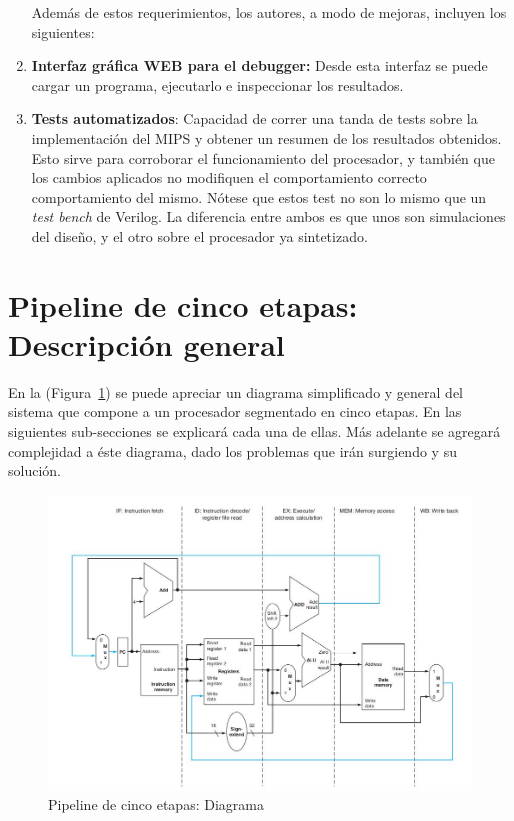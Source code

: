 \documentclass[12pt]{article}
\begin{document}
\begin{enumerate}
      Además de estos requerimientos, los autores, a modo de mejoras, incluyen los siguientes: \\

      \item \textbf{Interfaz gráfica WEB para el debugger:} Desde esta interfaz se puede cargar un programa, ejecutarlo e inspeccionar los resultados.
      \item \textbf{Tests automatizados}: Capacidad de correr una tanda de tests sobre la implementación del MIPS y obtener un resumen de los resultados obtenidos. Esto sirve para corroborar el funcionamiento del procesador, y también que los cambios aplicados no modifiquen el comportamiento correcto comportamiento del mismo. Nótese que estos test no son lo mismo que un \textit{test bench} de Verilog. La diferencia entre ambos es que unos son simulaciones del diseño, y el otro sobre el procesador ya sintetizado. 
\end{enumerate}

\section{Pipeline de cinco etapas: Descripción general}

En la (Figura~\ref{fig:pipeline}) se puede apreciar un diagrama simplificado y general del sistema que compone a un procesador segmentado en cinco etapas. En las siguientes sub-secciones se explicará cada una de ellas. Más adelante se agregará complejidad a éste diagrama, dado los problemas que irán surgiendo y su solución.

\begin{figure}[ht]
\centering
\hspace*{-1cm} 
\includegraphics[width=1.1\textwidth]{imagenes/esquema_pipeline.jpeg}
\caption{Pipeline de cinco etapas: Diagrama \cite{patterson}}
\label{fig:pipeline}
\end{figure}
\end{document}
